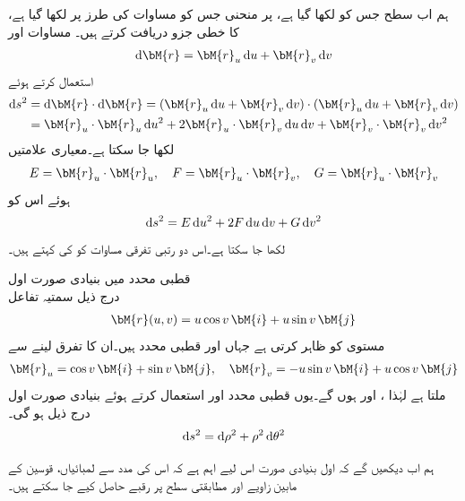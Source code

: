 ہم اب سطح  جس کو  لکھا گیا ہے، پر منحنی  جس کو مساوات  کی طرز پر لکھا گیا ہے،  کا خطی جزو دریافت کرتے ہیں۔ مساوات  اور
\begin{align*}
\dif \bM{r}=\bM{r}_u\dif u+\bM{r}_v\dif v
\end{align*}
استعمال کرتے ہوئے
\begin{align*}
\dif s^2&=\dif \bM{r}\cdot \dif \bM{r}=(\bM{r}_u\dif u+\bM{r}_v\dif v)\cdot (\bM{r}_u\dif u+\bM{r}_v\dif v)\\
&=\bM{r}_u\cdot \bM{r}_u \dif u^2+2\bM{r}_u\cdot \bM{r}_v\dif u\dif v+\bM{r}_v\cdot \bM{r}_v\dif v^2
\end{align*}
لکھا جا سکتا ہے۔معیاری علامتیں
\begin{align}\label{مساوات_خطی_تکمل_پہلی_بنیادی_صورت_الف}
E=\bM{r}_u\cdot \bM{r}_u,\quad F=\bM{r}_u\cdot \bM{r}_v,\quad G=\bM{r}_u\cdot \bM{r}_v
\end{align}
ہوئے اس کو 
\begin{align}\label{مساوات_خطی_تکمل_پہلی_بنیادی_صورت_ب}
\dif s^2=E\dif u^2+2F\dif u\dif v+G\dif v^2
\end{align}
لکھا جا سکتا ہے۔اس دو رتبی تفرقی مساوات کو  کی  کہتے ہیں۔

\quad قطبی محدد میں بنیادی صورت اول\\
درج ذیل سمتیہ  تفاعل
\begin{align*}
\bM{r}(u,v)=u\cos v\,\bM{i}+u\sin v\,\bM{j}
\end{align*}
 مستوی کو ظاہر کرتی ہے جہاں  اور  قطبی محدد ہیں۔ان کا تفرق لینے سے 
\begin{align*}
\bM{r}_u=\cos v\,\bM{i}+\sin v\,\bM{j},\quad \bM{r}_v=-u\sin v\,\bM{i}+u\cos v \,\bM{j}
\end{align*}
ملتا ہے لہٰذا ،  اور ہوں گے۔یوں قطبی محدد  اور  استعمال کرتے ہوئے بنیادی صورت اول درج ذیل ہو گی۔
\begin{align}\label{مساوات_خطی_تکمل_پہلی_بنیادی_صورت_پ}
\dif s^2=\dif \rho^2+\rho^2\dif \theta^2
\end{align}

ہم اب دیکھیں گے کہ اول بنیادی صورت اس لیے اہم ہے کہ اس کی مدد سے لمبائیاں، قوسین کے مابین زاویے اور مطابقتی سطح  پر رقبے حاصل کیے جا سکتے ہیں۔

